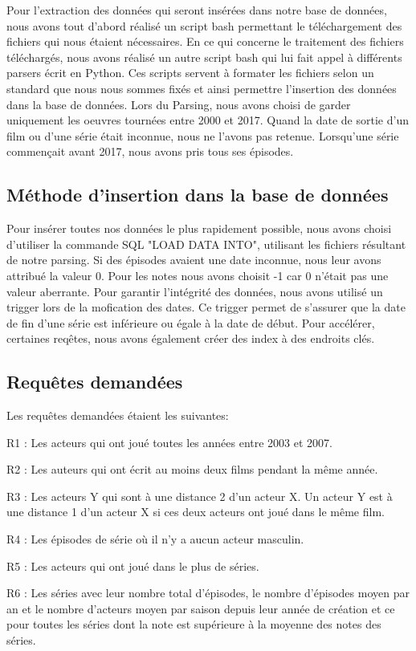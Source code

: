 \documentclass[10pt,a4paper]{article}
\begin{document}
Pour l'extraction des données qui seront insérées dans notre base de données, nous avons tout d'abord réalisé un script bash permettant le téléchargement des fichiers qui nous étaient nécessaires. En ce qui concerne le traitement des fichiers téléchargés, nous avons réalisé un autre script bash qui lui fait appel à différents parsers écrit en Python. Ces scripts servent à formater les fichiers selon un standard que nous nous sommes fixés et ainsi permettre l'insertion des données dans la base de données. Lors du Parsing, nous avons choisi de garder uniquement les oeuvres tournées entre 2000 et 2017. Quand la date de sortie d'un film ou d'une série était inconnue, nous ne l'avons pas retenue. Lorsqu'une série commençait avant 2017, nous avons pris tous ses épisodes.

\subsection{Méthode d'insertion dans la base de données}

Pour insérer toutes nos données le plus rapidement possible, nous avons choisi d'utiliser la commande SQL "LOAD DATA INTO", utilisant les fichiers résultant de notre parsing. Si des épisodes avaient une date inconnue, nous leur avons attribué la valeur 0. Pour les notes nous avons choisit -1 car 0 n'était pas une valeur aberrante.
\vskip 10pt
Pour garantir l'intégrité des données, nous avons utilisé un trigger lors de la mofication des dates. Ce trigger permet de s'assurer que la date de fin d'une série est inférieure ou égale à la date de début.
\vskip 10pt
Pour accélérer, certaines reqêtes, nous avons également créer des index à des endroits clés.

\subsection{Requêtes demandées}
Les requêtes demandées étaient les suivantes:
\begin{list}{-}{}
  \item R1 : Les acteurs qui ont joué toutes les années entre 2003 et
    2007.
  \item R2 : Les auteurs qui ont écrit au moins deux films pendant la
    même année.
  \item R3 : Les acteurs Y qui sont à une distance 2 d'un acteur X. Un
    acteur Y est à une distance 1 d'un acteur X si ces deux acteurs
    ont joué dans le même film.
  \item R4 : Les épisodes de série où il n'y a aucun acteur masculin.
  \item R5 : Les acteurs qui ont joué dans le plus de séries.
  \item R6 : Les séries avec leur nombre total d'épisodes, le nombre
    d'épisodes moyen par an et le nombre d'acteurs moyen par saison
    depuis leur année de création et ce pour toutes les séries dont la
    note est supérieure à la moyenne des notes des séries.
\end{list}
\end{document}
